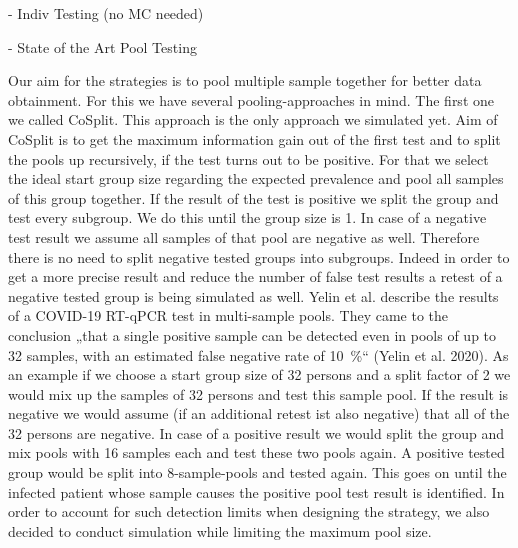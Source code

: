 \documentclass[fleqn,10pt]{wlscirep}
\begin{document}
- Indiv Testing (no MC needed)

- State of the Art Pool Testing

Our aim for the strategies is to pool multiple sample together for better data obtainment. For this we have several pooling-approaches in mind.
The first one we called CoSplit. This approach is the only approach we simulated yet. Aim of CoSplit is to get the maximum information gain out of the first test and to split the pools up recursively, if the test turns out to be positive. For that we select the ideal start group size regarding the expected prevalence and pool all samples of this group together. If the result of the test is positive we split the group and test every subgroup. We do this until the group size is 1. In case of a negative test result we assume all samples of that pool are negative as well. Therefore there is no need to split negative tested groups into subgroups. Indeed in order to get a more precise result and reduce the number of false test results a retest of a negative tested group is being simulated as well. 
Yelin et al. describe the results of a COVID-19 RT-qPCR test in multi-sample pools. They came to the conclusion „that a single positive sample can be detected even in pools of up to 32 samples, with an estimated false negative rate of \SI{10}{\percent}“ (Yelin et al. 2020). 
As an example if we choose a start group size of 32 persons and a split factor of 2 we would mix up the samples of 32 persons and test this sample pool. If the result is negative we would assume (if an additional retest ist also negative) that all of the 32 persons are negative. In case of a positive result we would split the group and mix pools with 16 samples each and test these two pools again. A positive tested group would be split into 8-sample-pools and tested again. This goes on until the infected patient whose sample causes the positive pool test result is identified. In order to account for such detection limits when designing the strategy, we also decided to conduct simulation while limiting the maximum pool size.
\end{document}
